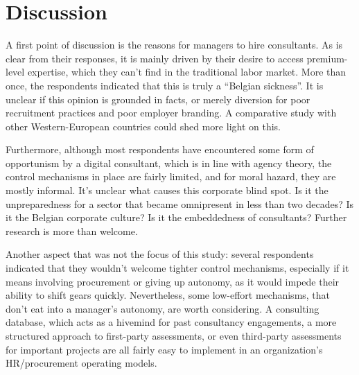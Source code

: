 \documentclass[12pt]{article}
\begin{document}
\section{Discussion}\label{discussion}

A first point of discussion is the reasons for managers to hire
consultants. As is clear from their responses, it is mainly driven by
their desire to access premium-level expertise, which they can't find in
the traditional labor market. More than once, the respondents indicated
that this is truly a ``Belgian sickness''. It is unclear if this opinion
is grounded in facts, or merely diversion for poor recruitment practices
and poor employer branding. A comparative study with other
Western-European countries could shed more light on this.

Furthermore, although most respondents have encountered some form of
opportunism by a digital consultant, which is in line with agency
theory, the control mechanisms in place are fairly limited, and for
moral hazard, they are mostly informal. It's unclear what causes this
corporate blind spot. Is it the unpreparedness for a sector that became
omnipresent in less than two decades? Is it the Belgian corporate
culture? Is it the embeddedness of consultants? Further research is more
than welcome.

Another aspect that was not the focus of this study: several respondents
indicated that they wouldn't welcome tighter control mechanisms,
especially if it means involving procurement or giving up autonomy, as
it would impede their ability to shift gears quickly. Nevertheless, some
low-effort mechanisms, that don't eat into a manager's autonomy, are
worth considering. A consulting database, which acts as a hivemind for
past consultancy engagements, a more structured approach to first-party
assessments, or even third-party assessments for important projects are
all fairly easy to implement in an organization's HR/procurement
operating models.


\renewcommand\refname{References}

\end{document}
